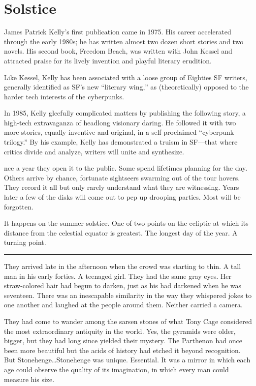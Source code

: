 \chapter{Solstice}

James Patrick Kelly's first publication came in 1975. His career accelerated through the early 1980s; he has written almost two dozen short stories and two novels. His second book, Freedom Beach, was written with John Kessel and attracted praise for its lively invention and playful literary erudition.

Like Kessel, Kelly has been associated with a loose group of Eighties SF writers, generally identified as SF's new ``literary wing,'' as (theoretically) opposed to the harder tech interests of the cyberpunks.

In 1985, Kelly gleefully complicated matters by publishing the following story, a high-tech extravaganza of headlong visionary daring. He followed it with two more stories, equally inventive and original, in a self-proclaimed ``cyberpunk trilogy.'' By his example, Kelly has demonstrated a truism in SF---that where critics divide and analyze, writers will unite and synthesize.

\hrulefill

nce a year they open it to the public. Some spend lifetimes planning for the day. Others arrive by chance, fortunate sightseers swarming out of the tour hovers. They record it all but only rarely understand what they are witnessing. Years later a few of the disks will come out to pep up drooping parties. Most will be forgotten.

It happens on the summer solstice. One of two points on the ecliptic at which its distance from the celestial equator is greatest. The longest day of the year. A turning point.

\fancybreak{* * *}

They arrived late in the afternoon when the crowd was starting to thin. A tall man in his early forties. A teenaged girl. They had the same gray eyes. Her straw-colored hair had begun to darken, just as his had darkened when he was seventeen. There was an inescapable similarity in the way they whispered jokes to one another and laughed at the people around them. Neither carried a camera.

They had come to wander among the sarsen stones of what Tony Cage considered the most extraordinary antiquity in the world. Yes, the pyramids were older, bigger, but they had long since yielded their mystery. The Parthenon had once been more beautiful but the acids of history had etched it beyond recognition. But Stonehenge\ldots Stonehenge was unique. Essential. It was a mirror in which each age could observe the quality of its imagination, in which every man could measure his size.

